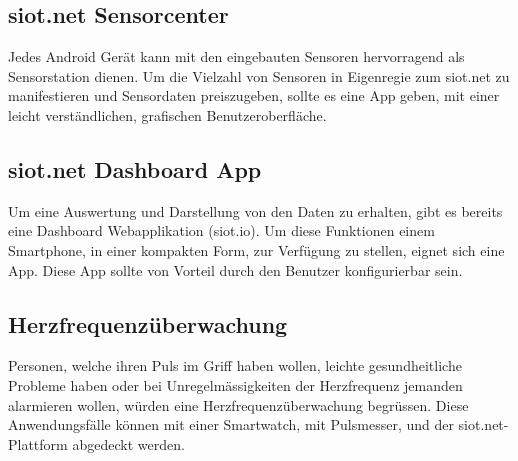 \subsection{siot.net Sensorcenter}
Jedes Android Gerät kann mit den eingebauten Sensoren hervorragend als Sensorstation dienen. Um die Vielzahl von Sensoren in Eigenregie zum siot.net zu manifestieren und Sensordaten preiszugeben, sollte es eine App geben, mit einer leicht verständlichen, grafischen Benutzeroberfläche.

\subsection{siot.net Dashboard App}
Um eine Auswertung und Darstellung von den Daten zu erhalten, gibt es bereits eine Dashboard Webapplikation (siot.io). Um diese Funktionen einem Smartphone, in einer kompakten Form, zur Verfügung zu stellen, eignet sich eine App. Diese App sollte von Vorteil durch den Benutzer konfigurierbar sein.

\subsection{Herzfrequenzüberwachung}
Personen, welche ihren Puls im Griff haben wollen, leichte gesundheitliche Probleme haben oder bei Unregelmässigkeiten der Herzfrequenz jemanden alarmieren wollen, würden eine Herzfrequenzüberwachung begrüssen. Diese Anwendungsfälle können mit einer Smartwatch, mit Pulsmesser, und der siot.net-Plattform abgedeckt werden.

